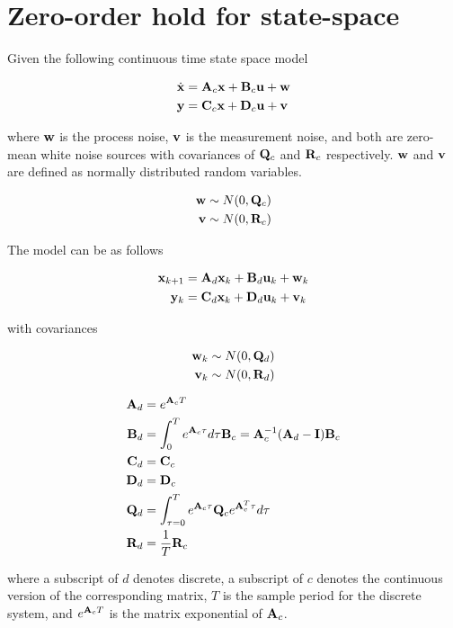 \section{Zero-order hold for state-space}

Given the following continuous time state space model

\begin{align*}
  \dot{\mathbf{x}} &= \mathbf{A}_c\mathbf{x} + \mathbf{B}_c\mathbf{u} + \mathbf{w} \\
  \mathbf{y} &= \mathbf{C}_c\mathbf{x} + \mathbf{D}_c\mathbf{u} + \mathbf{v}
\end{align*}

where $\mathbf{w}$ is the process noise, $\mathbf{v}$ is the measurement noise, and
both are zero-mean white noise sources with covariances of $\mathbf{Q}_c$ and
$\mathbf{R}_c$ respectively. $\mathbf{w}$ and $\mathbf{v}$ are defined as normally
distributed random variables.

\begin{align*}
  \mathbf{w} &\sim N(0, \mathbf{Q}_c) \\
  \mathbf{v} &\sim N(0, \mathbf{R}_c)
\end{align*}

The model can be  as follows

\begin{align*}
  \mathbf{x}_{k+1} &= \mathbf{A}_d \mathbf{x}_k + \mathbf{B}_d \mathbf{u}_k + \mathbf{w}_k \\
   \mathbf{y}_k &= \mathbf{C}_d \mathbf{x}_k + \mathbf{D}_d \mathbf{u}_k + \mathbf{v}_k
\end{align*}

with covariances

\begin{align*}
  \mathbf{w}_k &\sim N(0, \mathbf{Q}_d) \\
  \mathbf{v}_k &\sim N(0, \mathbf{R}_d)
\end{align*}

\begin{theorem}
  \label{thm:zoh_ss}

  \begin{align}
    \mathbf{A}_d &= e^{\mathbf{A}_c T} \\
    \mathbf{B}_d &= \int_0^T e^{\mathbf{A}_c \tau} d\tau \mathbf{B}_c =
      \mathbf{A}_c^{-1} (\mathbf{A}_d - \mathbf{I}) \mathbf{B}_c \\
    \mathbf{C}_d &= \mathbf{C}_c \\
    \mathbf{D}_d &= \mathbf{D}_c \\
    \mathbf{Q}_d &= \int_{\tau = 0}^{T} e^{\mathbf{A}_c\tau} \mathbf{Q}_c
      e^{\mathbf{A}_c^T\tau} d\tau \\
    \mathbf{R}_d &= \frac{1}{T}\mathbf{R}_c
  \end{align}

  where a subscript of $d$ denotes discrete, a subscript of $c$ denotes the
  continuous version of the corresponding matrix, $T$ is the sample period for
  the discrete \gls{system}, and $e^{\mathbf{A}_c T}$ is the matrix exponential of
  $\mathbf{A}_c$.
\end{theorem}

